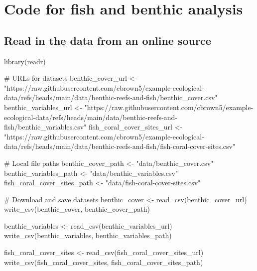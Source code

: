 \documentclass[
  letterpaper,
  DIV=11,
  numbers=noendperiod]{scrreprt}
\newenvironment{Shaded}{\begin{snugshade}}{\end{snugshade}}
\newcommand{\CommentTok}[1]{\textcolor[rgb]{0.37,0.37,0.37}{#1}}
\newcommand{\FunctionTok}[1]{\textcolor[rgb]{0.28,0.35,0.67}{#1}}
\newcommand{\NormalTok}[1]{\textcolor[rgb]{0.00,0.23,0.31}{#1}}
\newcommand{\OtherTok}[1]{\textcolor[rgb]{0.00,0.23,0.31}{#1}}
\newcommand{\StringTok}[1]{\textcolor[rgb]{0.13,0.47,0.30}{#1}}
\begin{document}
\chapter{Code for fish and benthic
analysis}\label{code-for-fish-and-benthic-analysis}

\section{Read in the data from an online
source}\label{read-in-the-data-from-an-online-source}

\begin{Shaded}
\begin{Highlighting}[]
\FunctionTok{library}\NormalTok{(readr)}

\CommentTok{\# URLs for datasets}
\NormalTok{benthic\_cover\_url }\OtherTok{\textless{}{-}} \StringTok{"https://raw.githubusercontent.com/cbrown5/example{-}ecological{-}data/refs/heads/main/data/benthic{-}reefs{-}and{-}fish/benthic\_cover.csv"}
\NormalTok{benthic\_variables\_url }\OtherTok{\textless{}{-}} \StringTok{"https://raw.githubusercontent.com/cbrown5/example{-}ecological{-}data/refs/heads/main/data/benthic{-}reefs{-}and{-}fish/benthic\_variables.csv"}
\NormalTok{fish\_coral\_cover\_sites\_url }\OtherTok{\textless{}{-}} \StringTok{"https://raw.githubusercontent.com/cbrown5/example{-}ecological{-}data/refs/heads/main/data/benthic{-}reefs{-}and{-}fish/fish{-}coral{-}cover{-}sites.csv"}

\CommentTok{\# Local file paths}
\NormalTok{benthic\_cover\_path }\OtherTok{\textless{}{-}} \StringTok{"data/benthic\_cover.csv"}
\NormalTok{benthic\_variables\_path }\OtherTok{\textless{}{-}} \StringTok{"data/benthic\_variables.csv"}
\NormalTok{fish\_coral\_cover\_sites\_path }\OtherTok{\textless{}{-}} \StringTok{"data/fish{-}coral{-}cover{-}sites.csv"}

\CommentTok{\# Download and save datasets}
\NormalTok{benthic\_cover }\OtherTok{\textless{}{-}} \FunctionTok{read\_csv}\NormalTok{(benthic\_cover\_url)}
\FunctionTok{write\_csv}\NormalTok{(benthic\_cover, benthic\_cover\_path)}

\NormalTok{benthic\_variables }\OtherTok{\textless{}{-}} \FunctionTok{read\_csv}\NormalTok{(benthic\_variables\_url)}
\FunctionTok{write\_csv}\NormalTok{(benthic\_variables, benthic\_variables\_path)}

\NormalTok{fish\_coral\_cover\_sites }\OtherTok{\textless{}{-}} \FunctionTok{read\_csv}\NormalTok{(fish\_coral\_cover\_sites\_url)}
\FunctionTok{write\_csv}\NormalTok{(fish\_coral\_cover\_sites, fish\_coral\_cover\_sites\_path)}
\end{Highlighting}
\end{Shaded}
\end{document}
